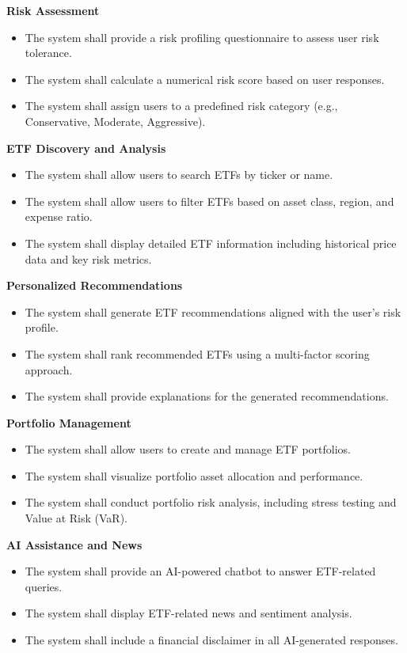 \textbf{Risk Assessment}
\begin{itemize}
    \item The system shall provide a risk profiling questionnaire to assess user risk tolerance.
    \item The system shall calculate a numerical risk score based on user responses.
    \item The system shall assign users to a predefined risk category (e.g., Conservative, Moderate, Aggressive).
\end{itemize}

\textbf{ETF Discovery and Analysis}
\begin{itemize}
    \item The system shall allow users to search ETFs by ticker or name.
    \item The system shall allow users to filter ETFs based on asset class, region, and expense ratio.
    \item The system shall display detailed ETF information including historical price data and key risk metrics.
\end{itemize}

\textbf{Personalized Recommendations}
\begin{itemize}
    \item The system shall generate ETF recommendations aligned with the user’s risk profile.
    \item The system shall rank recommended ETFs using a multi-factor scoring approach.
    \item The system shall provide explanations for the generated recommendations.
\end{itemize}

\textbf{Portfolio Management}
\begin{itemize}
    \item The system shall allow users to create and manage ETF portfolios.
    \item The system shall visualize portfolio asset allocation and performance.
    \item The system shall conduct portfolio risk analysis, including stress testing and Value at Risk (VaR).
\end{itemize}

\textbf{AI Assistance and News}
\begin{itemize}
    \item The system shall provide an AI-powered chatbot to answer ETF-related queries.
    \item The system shall display ETF-related news and sentiment analysis.
    \item The system shall include a financial disclaimer in all AI-generated responses.
\end{itemize}





